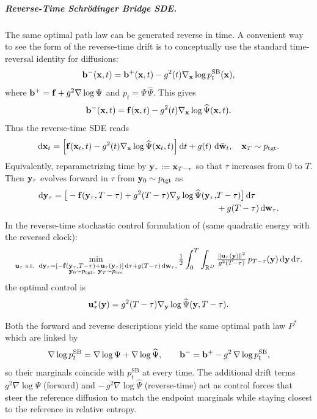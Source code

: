 \subparagraph{Reverse-Time Schrödinger Bridge SDE.}
The same optimal path law can be generated reverse in time. A convenient way
to see the form of the reverse-time drift is to conceptually use the standard time-reversal identity for diffusions:
\[
{\mathbf{b}}^{-}({\mathbf{x}},t)={\mathbf{b}}^{+}({\mathbf{x}},t)-g^2(t)\nabla_{\mathbf{x}}\log p_t^{\mathrm{SB}}({\mathbf{x}}),
\]
where ${\mathbf{b}}^{+}={\mathbf{f}}+g^2\nabla\log\Psi$ and $p_t=\Psi\,\widehat{\Psi}$. This gives
\[
{\mathbf{b}}^{-}({\mathbf{x}},t)={\mathbf{f}}({\mathbf{x}},t)-g^2(t) \nabla_{\mathbf{x}}\log \widehat{\Psi}({\mathbf{x}},t).
\]
Thus the reverse-time SDE reads
\begin{align}\label{eq:sb-backward-sde}
\mathop{}\!\mathrm{d} {\mathbf{x}}_t
= \Big[{\mathbf{f}}({\mathbf{x}}_t,t) - g^2(t) \nabla_{{\mathbf{x}}}\log \widehat{\Psi}({\mathbf{x}}_t,t)\Big]\mathop{}\!\mathrm{d} t
+ g(t)\,\mathop{}\!\mathrm{d} \bar{{\mathbf{w}}}_t, \quad {\mathbf{x}}_T \sim p_{\mathrm{tgt}} .
\end{align}
Equivalently, reparametrizing time by ${\mathbf{y}}_\tau := {\mathbf{x}}_{T-\tau}$ so that
$\tau$ increases from $0$ to $T$. Then ${\mathbf{y}}_\tau$ evolves forward in $\tau$ from ${\mathbf{y}}_0 \sim p_{\mathrm{tgt}}$ as
\begin{align}\label{eq:sb-reverse-forward-tau}
\begin{aligned}
    \mathop{}\!\mathrm{d} {\mathbf{y}}_\tau
= \big[-{\mathbf{f}}({\mathbf{y}}_\tau,T-\tau) + g^2(T-\tau) \nabla_{{\mathbf{y}}}\log \widehat{\Psi}({\mathbf{y}}_\tau,&T-\tau)\big]\mathop{}\!\mathrm{d} \tau
\\&+ g(T-\tau) \mathop{}\!\mathrm{d} {\mathbf{w}}_\tau.
\end{aligned}
\end{align}
In the reverse-time stochastic control formulation of (same quadratic energy with the reversed clock):
\begin{align}
\min_{\substack{
{\mathbf{u}}_\tau \text{ s.t. }  
\mathop{}\!\mathrm{d} {\mathbf{y}}_\tau = \left[-{\mathbf{f}}({\mathbf{y}}_\tau,T-\tau)+{\mathbf{u}}_\tau({\mathbf{y}}_\tau)\right]\mathop{}\!\mathrm{d}\tau
+ g(T-\tau) \mathop{}\!\mathrm{d} {\mathbf{w}}_\tau,\\
{\mathbf{y}}_0 \sim p_{\mathrm{tgt}},\ {\mathbf{y}}_T \sim p_{\mathrm{src}}
}}
\tfrac12 \int_{0}^{T} \int_{\mathbb{R}^D} \tfrac{\|{\mathbf{u}}_\tau({\mathbf{y}})\|^2}{g^2(T-\tau)}\,p_{T-\tau}({\mathbf{y}})  \mathop{}\!\mathrm{d}{\mathbf{y}} \mathop{}\!\mathrm{d}\tau .
\end{align}
the optimal control is 
\[
{\mathbf{u}}_\tau^{*}({\mathbf{y}})=g^2(T-\tau)\nabla_{{\mathbf{y}}}\log\widehat{\Psi}({\mathbf{y}},T-\tau).
\]



Both the forward and reverse descriptions yield the same optimal path law $P^*$ which are linked by
\[
\nabla\log p_t^{\mathrm{SB}}=\nabla\log\Psi+\nabla\log\widehat\Psi,
\qquad
{\mathbf{b}}^{-}={\mathbf{b}}^{+}-g^2\,\nabla\log p_t^{\mathrm{SB}},
\]
so their marginals coincide with $p_t^{\mathrm{SB}}$ at every time.  The additional drift terms $g^2\nabla\log\Psi$ (forward) and
$-\,g^2\nabla\log\widehat{\Psi}$ (reverse-time) act as control forces that steer
the reference diffusion to match the endpoint marginals while staying closest
to the reference in relative entropy.





